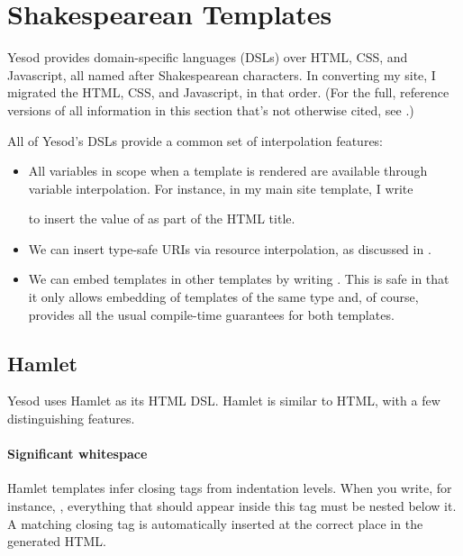 \section{Shakespearean Templates}

Yesod provides domain-specific languages (DSLs) over HTML, CSS, and Javascript, all named after Shakespearean characters. In converting my site, I migrated the HTML, CSS, and Javascript, in that order. (For the full, reference versions of all information in this section that's not otherwise cited, see \cite{ybkShakes}.)

All of Yesod's DSLs provide a common set of interpolation features:

\begin{itemize}
  \item {} All variables in scope when a template is rendered are available through variable interpolation. For instance, in my main site template, I write


    to insert the value of  as part of the HTML title.

  \item {} We can insert type-safe URIs via  resource interpolation, as discussed in .

  \item {} We can embed templates in other templates by writing . This is safe in that it only allows embedding of templates of the same type and, of course, provides all the usual compile-time guarantees for both templates. 
\end{itemize}

\subsection{Hamlet}

Yesod uses Hamlet as its HTML DSL. Hamlet is similar to HTML, with a few distinguishing features.

\paragraph{Significant whitespace} Hamlet templates infer closing tags from indentation levels. When you write, for instance, , everything that should appear inside this tag must be nested below it. A matching closing tag is automatically inserted at the correct place in the generated HTML. 

